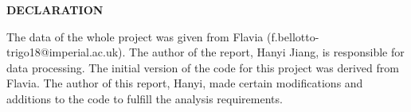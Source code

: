 \documentclass[12pt,twoside]{report}
\date{September 2023}
\begin{document}



\clearpage{\pagestyle{empty}\cleardoublepage}
\setcounter{page}{1}
\pagestyle{fancy}

\begin{center}
  \textbf{DECLARATION}
\end{center}
The data of the whole project was given from Flavia (f.bellotto-trigo18@imperial.ac.uk). The author of the report, Hanyi Jiang, is responsible for data processing. The initial version of the code for this project was derived from Flavia. The author of this report, Hanyi, made certain modifications and additions to the code to fulfill the analysis requirements. 


\begin{abstract} %

\\

\end{abstract}




\tableofcontents 


\clearpage{\pagestyle{empty}\cleardoublepage}
\setcounter{page}{1}
\fancyhead[LE,RO]{\slshape \rightmark}
\fancyhead[LO,RE]{\slshape \leftmark}

\end{document}
